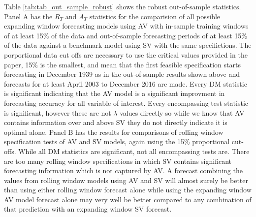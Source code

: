 Table \ref{tab:tab_out_sample_robust} shows the robust out-of-sample statistics. Panel A has the $R_{T}$ and $A_{T}$ statistics for the comparision of all possible expanding window forecasting models using AV with in-sample training windows of at least 15\% of the data and out-of-sample forecasting periods of at least 15\% of the data against a benchmark model using SV with the same specifictions. The porportional data cut offs are necessary to use the critical values provided in the \citet{rossi_out--sample_2012} paper, 15\% is the smallest, and mean that the first feasible specification starts forecasting in December 1939 as in the out-of-sample results shown above and forecasts for at least April 2003 to December 2016 are made. Every DM statistic is significant indicating that the AV model is a significant improvment in forecasting accuracy for all variable of interest. Every encompassing test statistic is significant, however these are not $\lambda$ values directly so while we know that AV contains information over and above SV they do not directly indicate it is optimal alone. Panel B has the results for comparisons of rolling window specification tests of AV and SV models, again using the 15\% proportional cut-offs. While all DM statistics are significant, not all encompassing tests are. There are too many rolling window specifications in which SV contains significant forecasting information which is not captured by AV. A forecast combining the values from rolling window models using AV and SV will almost surely be better than using either rolling window forecast alone while using the expanding window AV model forecast alone may very well be better compared to any combination of that prediction with an expanding window SV forecast.
